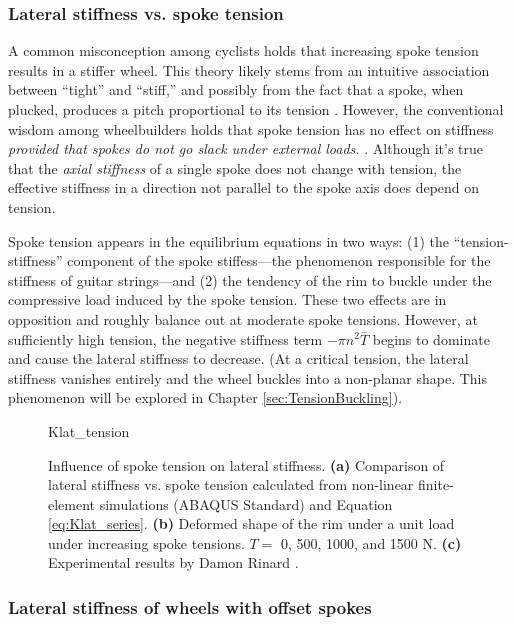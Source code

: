 \documentclass[\rootdir/thesis.tex]{subfiles}
\begin{document}
\subsubsection{Lateral stiffness vs. spoke tension}

A common misconception among cyclists holds that increasing spoke tension results in a stiffer wheel. This theory likely stems from an intuitive association between ``tight'' and ``stiff,'' and possibly from the fact that a spoke, when plucked, produces a pitch proportional to its tension \cite{JohnAllen}. However, the conventional wisdom among wheelbuilders holds that spoke tension has no effect on stiffness \emph{provided that spokes do not go slack under external loads.} \cite{Rinard,SlowTwitch,WheelFanatyk}. Although it's true that the \emph{axial stiffness} of a single spoke does not change with tension, the effective stiffness in a direction not parallel to the spoke axis does depend on tension.

Spoke tension appears in the equilibrium equations in two ways: (1) the ``tension-stiffness'' component of the spoke stiffess---the phenomenon responsible for the stiffness of guitar strings---and (2) the tendency of the rim to buckle under the compressive load induced by the spoke tension. These two effects are in opposition and roughly balance out at moderate spoke tensions. However, at sufficiently high tension, the negative stiffness term $-\pi n^2 \bar{T}$ begins to dominate and cause the lateral stiffness to decrease. (At a critical tension, the lateral stiffness vanishes entirely and the wheel buckles into a non-planar shape. This phenomenon will be explored in Chapter \ref{sec:TensionBuckling}).

\begin{figure}[h]
\centering
{Klat_tension}
\caption{Influence of spoke tension on lateral stiffness. \textbf{(a)} Comparison of lateral stiffness vs. spoke tension calculated from non-linear finite-element simulations (ABAQUS Standard) and Equation \eqref{eq:Klat_series}. \textbf{(b)} Deformed shape of the rim under a unit load under increasing spoke tensions. $T=\,\,$0, 500, 1000, and 1500 N. \textbf{(c)} Experimental results by Damon Rinard \cite{Rinard}.}
\label{fig:Klat_tension}
\end{figure}



\subsubsection{Lateral stiffness of wheels with offset spokes}
\end{document}
